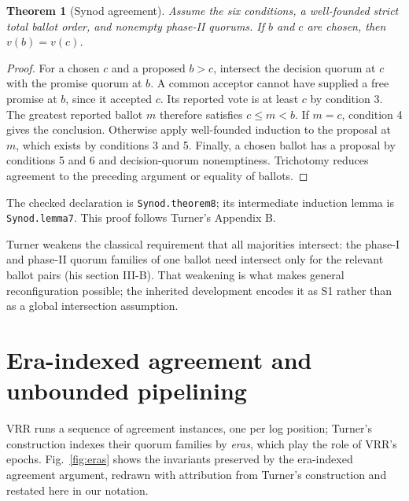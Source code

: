 \documentclass[10pt,journal,letterpaper]{IEEEtran}
\newtheorem{theorem}{Theorem}
\newcommand{\code}[1]{\texttt{\small #1}}
\begin{document}
\begin{theorem}[Synod agreement]
Assume the six conditions, a well-founded strict total ballot order, and
nonempty phase-II quorums. If $b$ and $c$ are chosen, then $v(b)=v(c)$.
\end{theorem}
\begin{proof}
For a chosen $c$ and a proposed $b>c$, intersect the decision quorum at $c$
with the promise quorum at $b$. A common acceptor cannot have supplied a free
promise at $b$, since it accepted $c$. Its reported vote is at least $c$ by
condition 3. The greatest reported ballot $m$ therefore satisfies
$c\le m<b$. If $m=c$, condition 4 gives the conclusion. Otherwise apply
well-founded induction to the proposal at $m$, which exists by conditions 3
and 5. Finally, a chosen ballot has a proposal by conditions 5 and 6 and
decision-quorum nonemptiness. Trichotomy reduces agreement to the preceding
argument or equality of ballots.
\end{proof}
The checked declaration is \code{Synod.theorem8}; its intermediate induction
lemma is \code{Synod.lemma7}. This proof follows Turner's Appendix B.

Turner weakens the classical requirement that all majorities intersect: the
phase-I and phase-II quorum families of one ballot need intersect only for
the relevant ballot pairs (his section III-B). That weakening is what makes
general reconfiguration possible; the inherited development encodes it as
S1 rather than as a global intersection assumption.

\section{Era-indexed agreement and unbounded pipelining}\label{sec:eras}
VRR runs a sequence of agreement instances, one per log position; Turner's
construction indexes their quorum families by \emph{eras}, which play the
role of VRR's epochs. Fig.~\ref{fig:eras} shows the invariants preserved by
the era-indexed agreement argument, redrawn with attribution from Turner's
construction and restated here in our notation.
\end{document}

